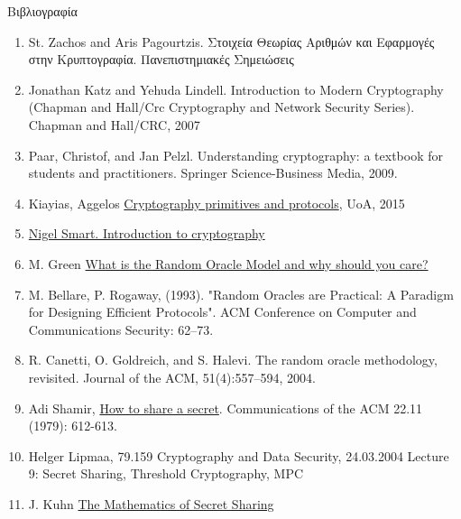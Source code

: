\documentclass[handout]{beamer}
\begin{document}
\begin{frame}[allowframebreaks]{Βιβλιογραφία}

\begin{tiny}
\begin{enumerate}
\item St. Zachos and Aris Pagourtzis. Στοιχεία Θεωρίας Αριθμών και Εφαρμογές στην Κρυπτογραφία. Πανεπιστημιακές Σημειώσεις
\item Jonathan Katz and Yehuda Lindell. Introduction to Modern Cryptography (Chapman and Hall/Crc Cryptography and Network Security Series). Chapman
and Hall/CRC, 2007
\item Paar, Christof, and Jan Pelzl. Understanding cryptography: a textbook for students and practitioners. Springer Science-Business Media, 2009.
\item Kiayias, Aggelos  \href{http://crypto.di.uoa.gr/class/Kryptographia/Semeioseis_files/Cryptograph_Primitives_and_Protocols.pdf}{Cryptography primitives and protocols}, UoA, 2015
\item \href{http://goo.gl/b75I29}{Nigel Smart. Introduction to cryptography} 
\medskip
\item M. Green \href{http://blog.cryptographyengineering.com/2011/09/what-is-random-oracle-model-and-why.html}{What is the Random Oracle Model and why should you care?}
\item M. Bellare, P. Rogaway, (1993). "Random Oracles are Practical: A Paradigm for Designing Efficient Protocols". ACM Conference on Computer and Communications Security: 62–73.
\item R. Canetti, O. Goldreich, and S. Halevi.  The random oracle methodology, revisited. Journal of the ACM, 51(4):557–594, 2004.
\item Adi Shamir, \href{http://www5.in.tum.de/lehre/vorlesungen/konkr_math/WS_10_11/prog/shamir.pdf}{How to share a secret}.  Communications of the ACM 22.11 (1979): 612-613.
\item Helger Lipmaa, 79.159 Cryptography and Data Security, 24.03.2004 Lecture 9: Secret Sharing, Threshold Cryptography, MPC 
\item J. Kuhn \href{https://jeremykun.com/2014/06/23/the-mathematics-of-secret-sharing/}{The Mathematics of Secret Sharing}
\end{enumerate}
\end{tiny}
\end{frame}
\end{document}

